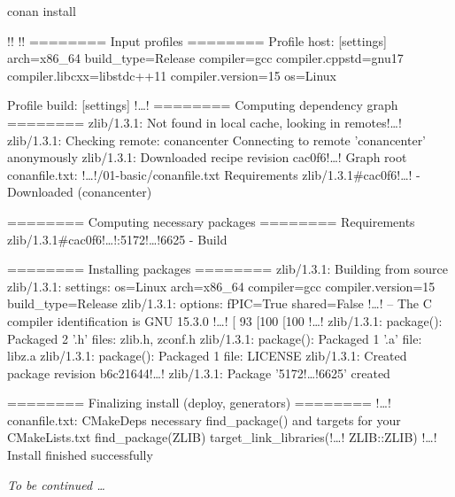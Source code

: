 \documentclass[compress, 8pt, aspectratio=169]{beamer}
\begin{document}
\begin{frame}[fragile]{conan install}

  {\small
  \begin{terminalwindow}[!!][minted options={escapeinside=!!, lastline=20}]
!!
!!
======== Input profiles ========
Profile host:
[settings]
arch=x86_64
build_type=Release
compiler=gcc
compiler.cppstd=gnu17
compiler.libcxx=libstdc++11
compiler.version=15
os=Linux

Profile build:
[settings]
!\dots!
======== Computing dependency graph ========
zlib/1.3.1: Not found in local cache, looking in remotes!\dots!
zlib/1.3.1: Checking remote: conancenter
Connecting to remote 'conancenter' anonymously
zlib/1.3.1: Downloaded recipe revision cac0f6!\dots!
Graph root
    conanfile.txt: !\dots!/01-basic/conanfile.txt
Requirements
    zlib/1.3.1#cac0f6!\dots! - Downloaded (conancenter)

======== Computing necessary packages ========
Requirements
    zlib/1.3.1#cac0f6!\dots!:5172!\dots!6625 - Build

======== Installing packages ========
zlib/1.3.1: Building from source
zlib/1.3.1: settings: os=Linux arch=x86_64 compiler=gcc compiler.version=15 build_type=Release
zlib/1.3.1: options: fPIC=True shared=False
!\dots!
-- The C compiler identification is GNU 15.3.0
!\dots!
[ 93%
[100%
[100%
!\dots!
zlib/1.3.1: package(): Packaged 2 '.h' files: zlib.h, zconf.h
zlib/1.3.1: package(): Packaged 1 '.a' file: libz.a
zlib/1.3.1: package(): Packaged 1 file: LICENSE
zlib/1.3.1: Created package revision b6c21644!\dots!
zlib/1.3.1: Package '5172!\dots!6625' created

======== Finalizing install (deploy, generators) ========
!\dots!
conanfile.txt: CMakeDeps necessary find_package() and targets for your CMakeLists.txt
    find_package(ZLIB)
    target_link_libraries(!\dots! ZLIB::ZLIB)
!\dots!
Install finished successfully
  \end{terminalwindow}
  }

  \textit{To be continued \dots}

\end{frame}
\end{document}
